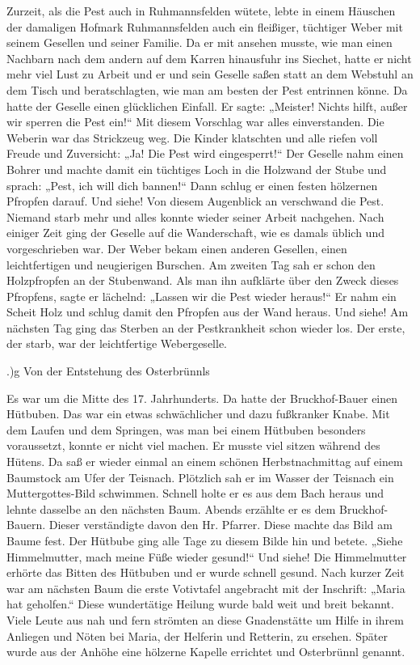 Zurzeit, als die Pest auch in Ruhmannsfelden wütete, lebte in einem Häuschen der
damaligen Hofmark Ruhmannsfelden auch ein fleißiger, tüchtiger Weber mit seinem
Gesellen und seiner Familie. Da er mit ansehen musste, wie man einen Nachbarn
nach dem andern auf dem Karren hinausfuhr ins Siechet, hatte er nicht mehr viel
Lust zu Arbeit und er und sein Geselle saßen statt an dem Webstuhl an dem Tisch
und beratschlagten, wie man am besten der Pest entrinnen könne. Da hatte der
Geselle einen glücklichen Einfall. Er sagte: „Meister! Nichts hilft, außer wir
sperren die Pest ein!“ Mit diesem Vorschlag war alles einverstanden. Die Weberin
war das Strickzeug weg. Die Kinder klatschten und alle riefen voll Freude und
Zuversicht: „Ja! Die Pest wird eingesperrt!“ Der Geselle nahm einen Bohrer und
machte damit ein tüchtiges Loch in die Holzwand der Stube und sprach: „Pest, ich
will dich bannen!“ Dann schlug er einen festen hölzernen Pfropfen darauf. Und
siehe! Von diesem Augenblick an verschwand die Pest. Niemand starb mehr und
alles konnte wieder seiner Arbeit nachgehen. Nach einiger Zeit ging der Geselle
auf die Wanderschaft, wie es damals üblich und vorgeschrieben war. Der Weber
bekam einen anderen Gesellen, einen leichtfertigen und neugierigen Burschen. Am
zweiten Tag sah er schon den Holzpfropfen an der Stubenwand. Als man ihn
aufklärte über den Zweck dieses Pfropfens, sagte er lächelnd: „Lassen wir die
Pest wieder heraus!“ Er nahm ein Scheit Holz und schlug damit den Pfropfen aus
der Wand heraus. Und siehe! Am nächsten Tag ging das Sterben an der
Pestkrankheit schon wieder los. Der erste, der starb, war der leichtfertige
Webergeselle.

.)g Von der Entstehung des Osterbrünnls

Es war um die Mitte des 17. Jahrhunderts. Da hatte der Bruckhof-Bauer einen
Hütbuben. Das war ein etwas schwächlicher und dazu fußkranker Knabe. Mit dem
Laufen und dem Springen, was man bei einem Hütbuben besonders voraussetzt,
konnte er nicht viel machen. Er musste viel sitzen während des Hütens. Da saß er
wieder einmal an einem schönen Herbstnachmittag auf einem Baumstock am Ufer der
Teisnach. Plötzlich sah er im Wasser der Teisnach ein Muttergottes-Bild
schwimmen. Schnell holte er es aus dem Bach heraus und lehnte dasselbe an den
nächsten Baum. Abends erzählte er es dem Bruckhof-Bauern. Dieser verständigte
davon den Hr. Pfarrer. Diese machte das Bild am Baume fest. Der Hütbube ging
alle Tage zu diesem Bilde hin und betete. „Siehe Himmelmutter, mach meine Füße
wieder gesund!“ Und siehe! Die Himmelmutter erhörte das Bitten des Hütbuben und
er wurde schnell gesund. Nach kurzer Zeit war am nächsten Baum die erste
Votivtafel angebracht mit der Inschrift: „Maria hat geholfen.“ Diese
wundertätige Heilung wurde bald weit und breit bekannt. Viele Leute aus nah und
fern strömten an diese Gnadenstätte um Hilfe in ihrem Anliegen und Nöten bei
Maria, der Helferin und Retterin, zu ersehen. Später wurde aus der Anhöhe eine
hölzerne Kapelle errichtet und Osterbrünnl genannt.

